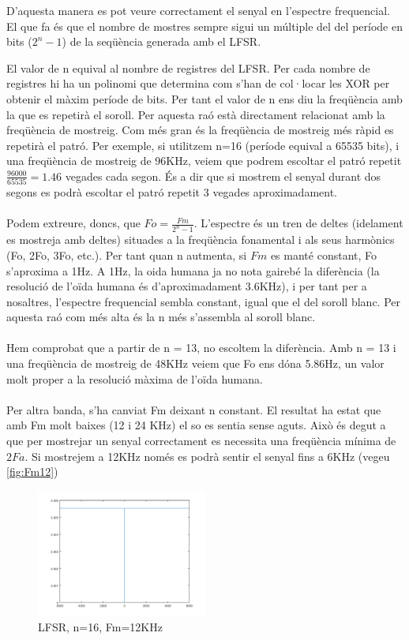 \documentclass[11pt]{report}
\begin{document}
D'aquesta manera es pot veure correctament el senyal en l'espectre frequencial. El que fa és que el nombre de mostres sempre sigui un múltiple del del període en bits ($2^n - 1$) de la seqüència generada amb el LFSR.

El valor de n equival al nombre de registres del LFSR. Per cada nombre de registres hi ha un polinomi que determina com s'han de col·locar les XOR per obtenir el màxim període de bits. Per tant el valor de n ens diu la freqüència amb la que es repetirà el soroll. Per aquesta raó està directament relacionat amb la freqüència de mostreig. Com més gran és la freqüència de mostreig més ràpid es repetirà el patró. Per exemple, si utilitzem n=16 (període equival a 65535 bits), i una freqüència de mostreig de 96KHz, veiem que podrem escoltar el patró repetit $\frac{96000}{65535}=1.46$ vegades cada segon. És a dir que si mostrem el senyal durant dos segons es podrà escoltar el patró repetit 3 vegades aproximadament.
\paragraph{}
Podem extreure, doncs, que $Fo=\frac{Fm}{2^n-1}$. L'espectre és un tren de deltes (idelament es mostreja amb deltes) situades a la freqüència fonamental i als seus harmònics (Fo, 2Fo, 3Fo, etc.). Per tant quan n autmenta, si $Fm$ es manté constant, Fo s'aproxima a 1Hz. A 1Hz, la oida humana ja no nota gairebé la diferència (la resolució de l'oïda humana és d'aproximadament 3.6KHz), i per tant per a nosaltres, l'espectre frequencial sembla constant, igual que el del soroll blanc. Per aquesta raó com més alta és la n més s'assembla al soroll blanc.
\paragraph{}
Hem comprobat que a partir de n = 13, no escoltem la diferència. Amb n = 13 i una freqüència de mostreig de 48KHz veiem que Fo ens dóna 5.86Hz, un valor molt proper a la resolució màxima de l'oïda humana.

\paragraph{}
Per altra banda, s'ha canviat Fm deixant n constant. El resultat ha estat que amb Fm molt baixes (12 i 24 KHz) el so es sentia sense aguts.
Això és degut a que per mostrejar un senyal correctament es necessita una freqüència mínima de $2Fa$. Si mostrejem a 12KHz només es podrà sentir el senyal fins a 6KHz (vegeu \ref{fig:Fm12})
\begin{figure}[h]
\label{Fm12}
  \centering
  \includegraphics[width=0.5\textwidth]{img/Fm12}
  \caption{LFSR, n=16, Fm=12KHz}
\end{figure}
\end{document}
